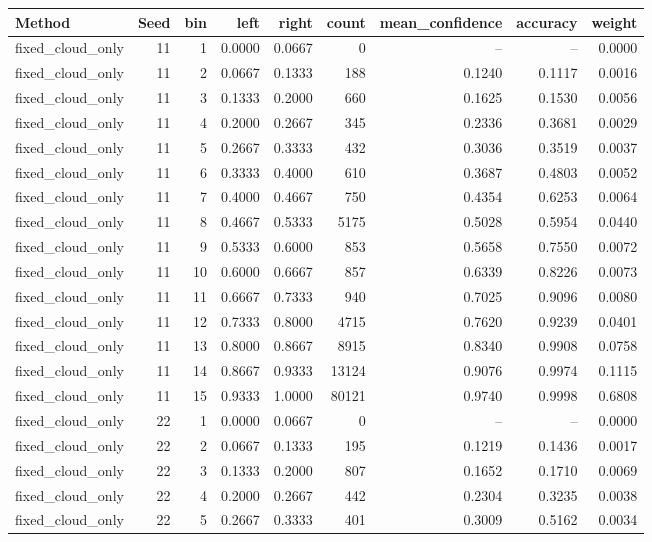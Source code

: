 \begin{tabular}{lrrrrrrrr}
\toprule
Method & Seed & bin & left & right & count & mean\_confidence & accuracy & weight \\
\midrule
fixed\_cloud\_only & 11 & 1 & 0.0000 & 0.0667 & 0 & -- & -- & 0.0000 \\
fixed\_cloud\_only & 11 & 2 & 0.0667 & 0.1333 & 188 & 0.1240 & 0.1117 & 0.0016 \\
fixed\_cloud\_only & 11 & 3 & 0.1333 & 0.2000 & 660 & 0.1625 & 0.1530 & 0.0056 \\
fixed\_cloud\_only & 11 & 4 & 0.2000 & 0.2667 & 345 & 0.2336 & 0.3681 & 0.0029 \\
fixed\_cloud\_only & 11 & 5 & 0.2667 & 0.3333 & 432 & 0.3036 & 0.3519 & 0.0037 \\
fixed\_cloud\_only & 11 & 6 & 0.3333 & 0.4000 & 610 & 0.3687 & 0.4803 & 0.0052 \\
fixed\_cloud\_only & 11 & 7 & 0.4000 & 0.4667 & 750 & 0.4354 & 0.6253 & 0.0064 \\
fixed\_cloud\_only & 11 & 8 & 0.4667 & 0.5333 & 5175 & 0.5028 & 0.5954 & 0.0440 \\
fixed\_cloud\_only & 11 & 9 & 0.5333 & 0.6000 & 853 & 0.5658 & 0.7550 & 0.0072 \\
fixed\_cloud\_only & 11 & 10 & 0.6000 & 0.6667 & 857 & 0.6339 & 0.8226 & 0.0073 \\
fixed\_cloud\_only & 11 & 11 & 0.6667 & 0.7333 & 940 & 0.7025 & 0.9096 & 0.0080 \\
fixed\_cloud\_only & 11 & 12 & 0.7333 & 0.8000 & 4715 & 0.7620 & 0.9239 & 0.0401 \\
fixed\_cloud\_only & 11 & 13 & 0.8000 & 0.8667 & 8915 & 0.8340 & 0.9908 & 0.0758 \\
fixed\_cloud\_only & 11 & 14 & 0.8667 & 0.9333 & 13124 & 0.9076 & 0.9974 & 0.1115 \\
fixed\_cloud\_only & 11 & 15 & 0.9333 & 1.0000 & 80121 & 0.9740 & 0.9998 & 0.6808 \\
fixed\_cloud\_only & 22 & 1 & 0.0000 & 0.0667 & 0 & -- & -- & 0.0000 \\
fixed\_cloud\_only & 22 & 2 & 0.0667 & 0.1333 & 195 & 0.1219 & 0.1436 & 0.0017 \\
fixed\_cloud\_only & 22 & 3 & 0.1333 & 0.2000 & 807 & 0.1652 & 0.1710 & 0.0069 \\
fixed\_cloud\_only & 22 & 4 & 0.2000 & 0.2667 & 442 & 0.2304 & 0.3235 & 0.0038 \\
fixed\_cloud\_only & 22 & 5 & 0.2667 & 0.3333 & 401 & 0.3009 & 0.5162 & 0.0034 \\

\end{tabular}
